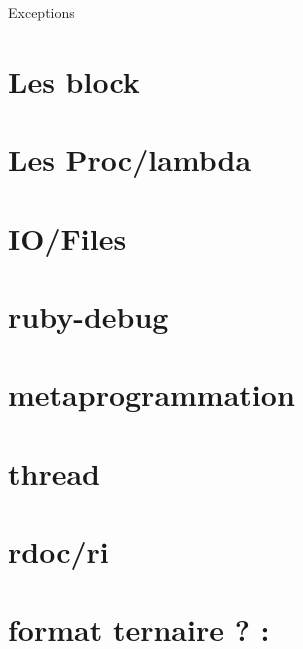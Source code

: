\documentclass{beamer}
\begin{document}
\begin{frame}
  \begin{beamerboxesrounded}{Exceptions}
    
  \end{beamerboxesrounded}
\end{frame}

\section{Les block}
\section{Les Proc/lambda}
\section{IO/Files}
\section{ruby-debug}
\section{metaprogrammation}
\section{thread}
\section{rdoc/ri}
\section{format ternaire ? :}
\end{document}
